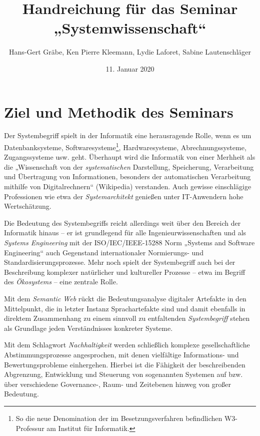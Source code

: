 \documentclass[11pt,a4paper]{article}
\title{Handreichung für das Seminar „Systemwissenschaft“}
\author{Hans-Gert Gr\"abe, Ken Pierre Kleemann, Lydie Laforet, Sabine
  Lautenschläger}
\date{11. Januar 2020}
\begin{document}
\maketitle

\section{Ziel und Methodik des Seminars}

Der Systembegriff spielt in der Informatik eine herausragende Rolle, wenn es
um Datenbanksysteme, Softwaresysteme\footnote{So die neue Denomination der im
  Besetzungsverfahren befindlichen W3-Professur am Institut für Informatik.},
Hardwaresysteme, Abrechnungssysteme, Zugangssysteme usw. geht.  Überhaupt wird
die Informatik von einer Merhheit als die „Wissenschaft von der
\emph{systematischen} Darstellung, Speicherung, Verarbeitung und Übertragung
von Informationen, besonders der automatischen Verarbeitung mithilfe von
Digitalrechnern“ (Wikipedia) verstanden.  Auch gewisse einschlägige
Professionen wie etwa der \emph{Systemarchitekt} genießen unter IT-Anwendern
hohe Wertschätzung.

Die Bedeutung des Systembegriffs reicht allerdings weit über den Bereich der
Informatik hinaus -- er ist grundlegend für alle Ingenieurwissenschaften und
als \emph{Systems Engineering} mit der ISO/IEC/IEEE-15288 Norm „Systems and
Software Engineering“ auch Gegenstand internationaler Normierungs- und
Standardisierungsprozesse.  Mehr noch spielt der Systembegriff auch bei der
Beschreibung komplexer natürlicher und kultureller Prozesse -- etwa im Begriff
des \emph{Ökosystems} -- eine zentrale Rolle.

Mit dem \emph{Semantic Web} rückt die Bedeutungsanalyse digitaler Artefakte in
den Mittelpunkt, die in letzter Instanz Sprachartefakte sind und damit
ebenfalls in direktem Zusammenhang zu einem sinnvoll zu entfaltenden
\emph{Systembegriff} stehen als Grundlage jeden Verständnisses konkreter
Systeme.

Mit dem Schlagwort \emph{Nachhaltigkeit} werden schließlich komplexe
gesellschaftliche Abstimmungsprozesse angesprochen, mit denen vielfältige
Informations- und Bewertungsprobleme einhergehen. Hierbei ist die Fähigkeit
der beschreibenden Abgrenzung, Entwicklung und Steuerung von sogenannten
Systemen auf bzw. über verschiedene Governance-, Raum- und Zeitebenen hinweg
von großer Bedeutung.
\end{document}

